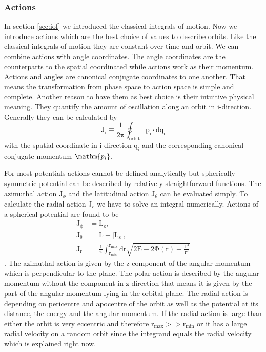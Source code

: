\subsubsection{Actions}\label{sec:actions}
In section \ref{sec:iof} we introduced the classical integrals of motion. Now we introduce actions which are the best choice of values to describe orbits. Like the classical integrals of motion they are constant over time and orbit. We can combine actions with angle coordinates. The angle coordinates are the counterparts to the spatial coordinated while actions work as their momentum. Actions and angles are canonical conjugate coordinates to one another. That means the transformation from phase space to action space is simple and complete. Another reason to have them as best choice is their intuitive physical meaning. They quantify the amount of oscillation along an orbit in i-direction. Generally they can be calculated by 
\begin{equation}\label{eq:gen_actions}
\mathrm{J_i\equiv\frac{1}{2\pi}\oint_{orbit} p_i\cdot dq_i}
\end{equation} with the spatial coordinate in i-direction \(\mathrm{q_i}\) and the corresponding canonical conjugate momentum \(\mathm{p_i}\). 
\par For most potentials actions cannot be defined analytically but spherically symmetric potential can be described by relatively straightforward functions. The azimuthal action J\(_\phi\) and the latitudinal action J\(_\theta\) can be evaluated simply. To calculate the radial action J\(_r\) we have to solve an integral numerically. Actions of a spherical potential are found to be 
\begin{align}\label{eq:actions}
\mathrm{J_\phi}&=\mathrm{ L_z}, \\\mathrm{ J_\theta}&=\mathrm{ L-|L_z|}, \\ \mathrm{J_r}&=\mathrm{ \frac{1}{\pi} \int_{r_{min}}^{r_{max}} \mathrm{d}r \sqrt{2E-2\Phi(r)-\frac{L^2}{r^2}}} 
\end{align} \citep[p. 221]{2008gady.book.....B}.
The azimuthal action is given by the z-component of the angular momentum which is perpendicular to the plane. The polar action is described by the angular momentum without the component in z-direction that means it is given by the part of the angular momentum lying in the orbital plane. The radial action is depending on pericentre and apocentre of the orbit as well as the potential at its distance, the energy and the angular momentum. If the radial action is large than either the orbit is very eccentric and therefore \(\mathrm{r_{max}>>r_{min}}\) or it has a large radial velocity on a random orbit since the integrand equals the radial velocity which is explained right now. 
